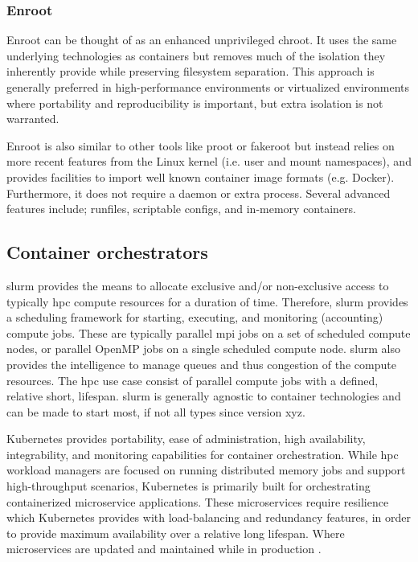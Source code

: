 \documentclass[conference]{IEEEtran}
\begin{document}
\subsubsection{Enroot}
Enroot can be thought of as an enhanced unprivileged chroot. It uses the same underlying technologies as containers but removes much of the isolation they inherently provide while preserving filesystem separation. This approach is generally preferred in high-performance environments or virtualized environments where portability and reproducibility is important, but extra isolation is not warranted.

Enroot is also similar to other tools like proot or fakeroot but instead relies on more recent features from the Linux kernel (i.e. user and mount namespaces), and provides facilities to import well known container image formats (e.g. Docker). Furthermore, it does not require a daemon or extra process. Several advanced features include; runfiles, scriptable configs, and in-memory containers.


\subsection{Container orchestrators}

\gls{slurm} provides the means to allocate exclusive and/or non-exclusive access to typically \gls{hpc} compute resources for a duration of time. Therefore, \gls{slurm} provides a scheduling framework for starting, executing, and monitoring (accounting) compute jobs. These are typically parallel \gls{mpi} jobs on a set of scheduled compute nodes, or parallel OpenMP jobs on a single scheduled compute node. \gls{slurm} also provides the intelligence to manage queues and thus congestion of the compute resources. The \gls{hpc} use case consist of parallel compute jobs with a defined, relative short, lifespan. \gls{slurm} is generally agnostic to container technologies and can be made to start most, if not all types since version xyz. 

Kubernetes provides portability, ease of administration, high availability, integrability, and monitoring capabilities for container orchestration. While \gls{hpc} workload managers are focused on running distributed memory jobs and support high-throughput scenarios, Kubernetes is primarily built for orchestrating containerized microservice applications. These microservices require resilience which Kubernetes provides with load-balancing and redundancy features, in order to provide maximum availability over a relative long lifespan. Where microservices are updated and maintained while in production \cite{hpc-kubernetes-containers}.
\end{document}
